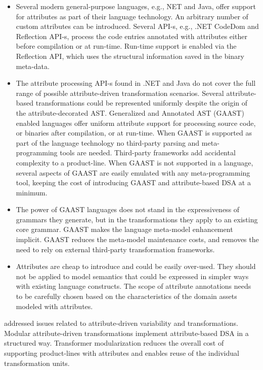 \begin{itemize}
\item Several modern general-purpose languages, e.g., NET and Java, offer support for attributes as part of their language technology. An arbitrary number of custom attributes can be introduced. Several API-s, e.g., .NET CodeDom and Reflection API-s, process the code entries annotated with attributes either before compilation or at run-time. Run-time support is enabled via the Reflection API, which uses the structural information saved in the binary meta-data.

\item The attribute processing API-s found in .NET and Java do not cover the full range of possible attribute-driven transformation scenarios. Several attribute-based transformations could be represented uniformly despite the origin of the attribute-decorated AST. Generalized and Annotated AST (GAAST) enabled languages offer uniform attribute support for processing source code, or binaries after compilation, or at run-time. When GAAST is supported as part of the language technology no third-party parsing and meta-programming tools are needed. Third-party frameworks add accidental complexity to a product-line. When GAAST is not supported in a language, several aspects of GAAST are easily emulated with any meta-programming tool, keeping the cost of introducing GAAST and attribute-based DSA at a minimum.

\item The power of GAAST languages does not stand in the expressiveness of grammars they generate, but in the transformations they apply to an existing core grammar. GAAST makes the language meta-model enhancement implicit. GAAST reduces the meta-model maintenance costs, and removes the need to rely on external third-party transformation frameworks.

\item Attributes are cheap to introduce and could be easily over-used. They should not be applied to model semantics that could be expressed in simpler ways with existing language constructs. The scope of attribute annotations needs to be carefully chosen based on the characteristics of the domain assets modeled with attributes.

\end{itemize}

\noindent \textbf{} addressed issues related to attribute-driven variability and transformations. Modular attribute-driven transformations implement attribute-based DSA in a structured way. Transformer modularization reduces the overall cost of supporting product-lines with attributes and enables reuse of the individual transformation units.

